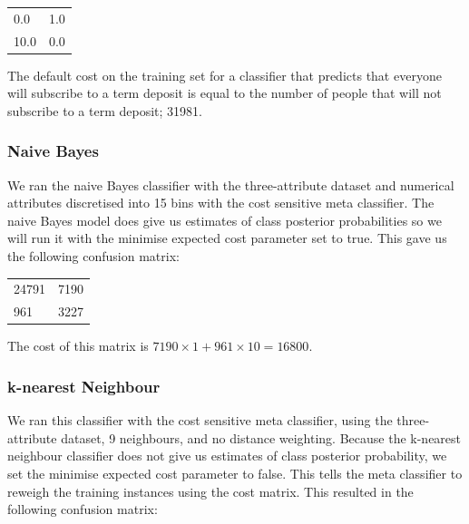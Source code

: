 \documentclass[a4paper,11pt]{article}
\begin{document}
\begin{table}[H]
  \begin{center}
    \begin{tabular}{l l }
      0.0 & 1.0 \\
      10.0 & 0.0 \\
    \end{tabular}
  \end{center}
  \label{tab:costMatrixStructure}
\end{table}

The default cost on the training set for a classifier that predicts that everyone will subscribe to a term deposit is equal
to the number of people that will not subscribe to a term deposit; 31981.

\subsubsection{Naive Bayes}

We ran the naive Bayes classifier with the three-attribute dataset and numerical attributes discretised into 15 bins
with the cost sensitive meta classifier. The naive Bayes model does give us estimates of class posterior
probabilities so we will run it with the minimise expected cost parameter set to true. This gave us the 
following confusion matrix:

\begin{table}[H]
  \begin{center}
    \begin{tabular}{l l }
      24791 & 7190 \\
      961 & 3227 \\
    \end{tabular}
  \end{center}
  \label{tab:naiveBayesCost}
\end{table}

The cost of this matrix is $ 7190 \times 1 + 961 \times 10 = 16800 $.

\subsubsection{k-nearest Neighbour}

We ran this classifier with the cost sensitive meta classifier, using the three-attribute dataset, 9 neighbours, 
and no distance weighting. Because the k-nearest neighbour classifier does not give us estimates of class posterior 
probability, we set the minimise expected cost parameter to false. This tells the meta classifier to reweigh 
the training instances using the cost matrix. This resulted in the following confusion matrix:
\end{document}
